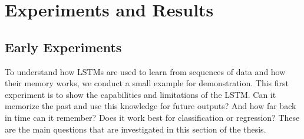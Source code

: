 \chapter{Experiments and Results}

	\section{Early Experiments}
	
	To understand how LSTMs are used to learn from sequences of data and how their memory works, we conduct a small example for demonstration. 
	This first experiment is to show the capabilities and limitations of the LSTM.
	Can it memorize the past and use this knowledge for future outputs?
	And how far back in time can it remember?
	Does it work best for classification or regression?
	These are the main questions that are investigated in this section of the thesis.
	
